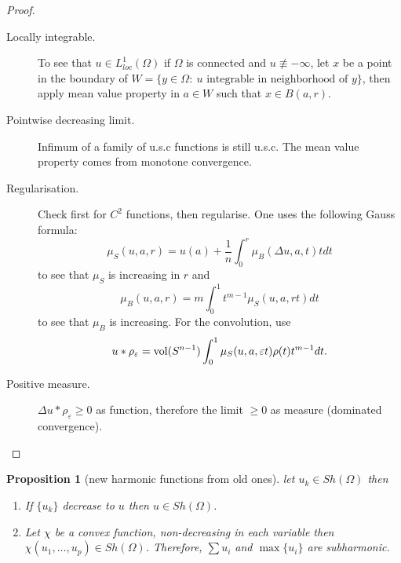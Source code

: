 \documentclass[11pt]{article}
\newtheorem{proposition}{Proposition}[theorem]
\newcommand{\vol}{\mathop{\rm vol}\nolimits}
\begin{document}
\begin{proof}
\begin{description}
\item[{Locally integrable.}] To see that \(u\in L^1_{loc}(\Omega)\) if \(\Omega\) is
connected and \(u\not\equiv -\infty\), let \(x\) be a point in the boundary of \(W=\{y\in \Omega:\ u\text{ integrable in neighborhood of } y\}\), then apply mean value property in \(a\in W\) such that \(x\in B(a,r)\).
\item[{Pointwise decreasing limit.}] Infimum of a family of u.s.c functions is still u.s.c. The
mean value property comes from monotone convergence.
\item[{Regularisation.}] Check first for \(C^2\) functions, then regularise. One uses the
following Gauss formula: 
\[
     \mu_S(u,a,r) = u(a) + \frac{1}{n}\int_0^r\mu_B(\Delta u, a, t)tdt
     \]
to see that \(\mu_S\) is increasing in \(r\) and
\[
     \mu_B(u,a,r) = m\int_0^1 t^{m-1}\mu_S(u,a,rt)dt
     \]
to see that \(\mu_B\) is increasing. For the convolution, use
\[
     u*\rho_\varepsilon = \vol(S^{n-1})\int_0^1 \mu_S(u,a,\varepsilon t)\rho(t) t^{m-1}dt.
     \]
\item[{Positive measure.}] \(\Delta u * \rho_\varepsilon \geq 0\) as function, therefore the
limit \(\geq 0\) as measure (dominated convergence).
\end{description}
\end{proof}

\begin{proposition}[new harmonic functions from old ones]
let \(u_k \in Sh(\Omega)\) then
\begin{enumerate}
\item If \(\{u_k\}\) decrease to \(u\) then \(u\in Sh(\Omega)\).
\item Let \(\chi\) be a convex function, non-decreasing in each variable then \(\chi(u_1,\dots,u_p) \in Sh(\Omega)\). Therefore, \(\sum u_i\) and \(\max\{u_i\}\)
are subharmonic.
\end{enumerate}
\end{proposition}
\end{document}
